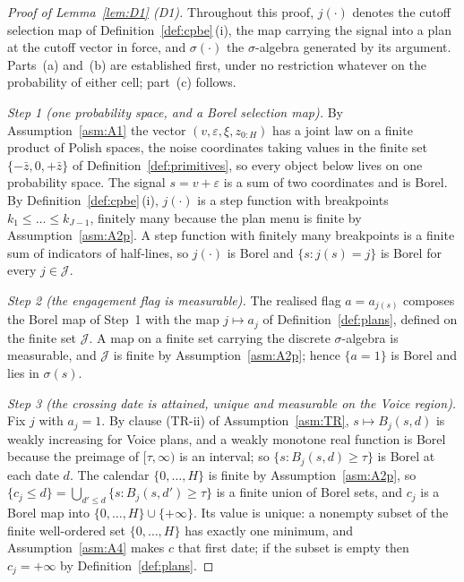 \documentclass[11pt]{article}
\begin{document}
\begin{proof}[Proof of Lemma~\ref{lem:D1} (D1)]
Throughout this proof, $j(\cdot)$ denotes the cutoff selection map of
Definition~\ref{def:cpbe}\,(i), the map carrying the signal into a plan at the cutoff vector in
force, and $\sigma(\cdot)$ the $\sigma$-algebra generated by its argument. Parts~(a) and~(b) are established first, under no restriction whatever on
the probability of either cell; part~(c) follows.

\emph{Step 1 (one probability space, and a Borel selection map).} By Assumption~\ref{asm:A1} the
vector $(v,\varepsilon,\xi,z_{0:H})$ has a joint law on a finite product of Polish spaces, the noise
coordinates taking values in the finite set $\{-\bar z,0,+\bar z\}$ of
Definition~\ref{def:primitives}, so every object below lives on one probability space. The signal
$s = v+\varepsilon$ is a sum of two coordinates and is Borel. By Definition~\ref{def:cpbe}\,(i),
$j(\cdot)$ is a step function with breakpoints $k_1 \le \dots \le k_{J-1}$, finitely many because the
plan menu is finite by Assumption~\ref{asm:A2p}. A step function with finitely many breakpoints is a
finite sum of indicators of half-lines, so $j(\cdot)$ is Borel and $\{s : j(s) = j\}$ is Borel for
every $j \in \mathcal J$.

\emph{Step 2 (the engagement flag is measurable).} The realised flag $a = a_{j(s)}$ composes the
Borel map of Step~1 with the map $j \mapsto a_j$ of Definition~\ref{def:plans}, defined on the finite
set $\mathcal J$. A map on a finite set carrying the discrete $\sigma$-algebra is measurable, and
$\mathcal J$ is finite by Assumption~\ref{asm:A2p}; hence $\{a=1\}$ is Borel and lies in $\sigma(s)$.

\emph{Step 3 (the crossing date is attained, unique and measurable on the Voice region).} Fix $j$
with $a_j = 1$. By clause (TR-ii) of Assumption~\ref{asm:TR}, $s \mapsto B_j(s,d)$ is weakly
increasing for Voice plans, and a weakly monotone real function is Borel because the preimage of
$[\tau,\infty)$ is an interval; so $\{s : B_j(s,d) \ge \tau\}$ is Borel at each date $d$. The
calendar $\{0,\dots,H\}$ is finite by Assumption~\ref{asm:A2p}, so
$\{c_j \le d\} = \bigcup_{d' \le d}\{s : B_j(s,d') \ge \tau\}$ is a finite union of Borel sets, and
$c_j$ is a Borel map into $\{0,\dots,H\} \cup \{+\infty\}$. Its value is unique: a nonempty subset of
the finite well-ordered set $\{0,\dots,H\}$ has exactly one minimum, and Assumption~\ref{asm:A4}
makes $c$ that first date; if the subset is empty then $c_j = +\infty$ by Definition~\ref{def:plans}.


\end{proof}
\end{document}
